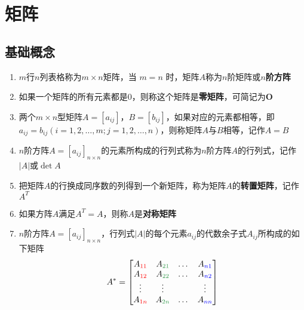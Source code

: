 \documentclass[a4paper,12pt]{article}
\begin{document}


    \section{矩阵}

    \subsection{基础概念}

    \begin{enumerate}
        \item $m$行$n$列表格称为$m \times n$矩阵，当 $m = n$ 时，矩阵$A$称为$n$阶矩阵或\textbf{$n$阶方阵}
        \item 如果一个矩阵的所有元素都是$0$，则称这个矩阵是\textbf{零矩阵}，可简记为$\mathbf{O}$
        \item 两个$m \times n$型矩阵$A = [a_{ij}]$，$B = [b_{ij}]$，如果对应的元素都相等，即$a_{ij} = b_{ij}(i = 1,2,\dots,m; j = 1,2,\dots,n)$，则称矩阵$A$与$B$相等，记作$A = B$
        \item $n$阶方阵$A = [a_{ij}]_{n \times n}$的元素所构成的行列式称为$n$阶方阵$A$的行列式，记作$|A|$或$\det A$
        \item 把矩阵$A$的行换成同序数的列得到一个新矩阵，称为矩阵$A$的\textbf{转置矩阵}，记作$A^T$
        \item 如果方阵$A$满足$A^T = A$，则称$A$是\textbf{对称矩阵}
        \item $n$阶方阵$A = [a_{ij}]_{n \times n}$，行列式$|A|$的每个元素$a_{ij}$的代数余子式$A_{ij}$所构成的如下矩阵
        \[
            A^* =
            \begin{bmatrix}
                A_{\color{red}{11}} & A_{\textcolor[rgb]{0.2, 0.6, 0.3}{21}} & \dots & A_{\textcolor{blue}{n1}} \\
                A_{\color{red}{12}} & A_{\textcolor[rgb]{0.2, 0.6, 0.3}{22}} & \dots & A_{\textcolor{blue}{n2}} \\
                \vdots              & \vdots                                 &       & \vdots                   \\
                A_{\color{red}{1n}} & A_{\textcolor[rgb]{0.2, 0.6, 0.3}{2n}} & \dots & A_{\textcolor{blue}{nn}}
            \end{bmatrix}
\]
\end{enumerate}
\end{document}
